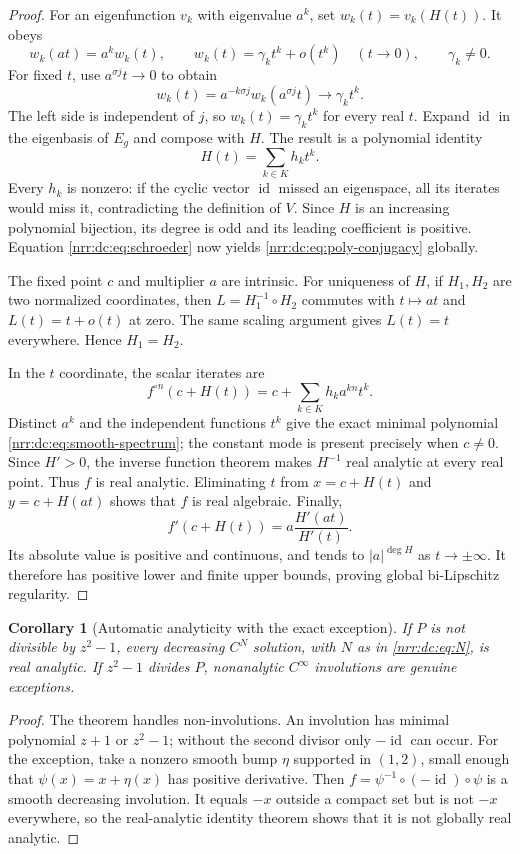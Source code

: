 \documentclass[11pt,letterpaper]{article}
\newtheorem{corollary}[theorem]{Corollary}
\theoremstyle{definition}
\theoremstyle{remark}
\newcommand{\id}{\operatorname{id}}
\begin{document}
\begin{proof}
For an eigenfunction $v_k$ with eigenvalue $a^k$, set
$w_k(t)=v_k(H(t))$. It obeys
\[
 w_k(at)=a^k w_k(t),\qquad
 w_k(t)=\gamma_k t^k+o(t^k)\quad(t\to0),\qquad\gamma_k\ne0.
\]
For fixed $t$, use $a^{\sigma j}t\to0$ to obtain
\[
 w_k(t)=a^{-k\sigma j}w_k(a^{\sigma j}t)
       \longrightarrow\gamma_k t^k.
\]
The left side is independent of $j$, so $w_k(t)=\gamma_k t^k$
for every real $t$. Expand $\id$ in the eigenbasis of $E_g$ and compose
with $H$. The result is a polynomial identity
\begin{equation}
 H(t)=\sum_{k\in K}h_kt^k.
 \label{nrr:dc:eq:H-polynomial}
\end{equation}
Every $h_k$ is nonzero: if the cyclic vector $\id$ missed an eigenspace,
all its iterates would miss it, contradicting the definition of $V$.
Since $H$ is an increasing polynomial bijection, its degree is odd
and its leading coefficient is positive. Equation \eqref{nrr:dc:eq:schroeder}
now yields \eqref{nrr:dc:eq:poly-conjugacy} globally.

The fixed point $c$ and multiplier $a$ are intrinsic. For uniqueness
of $H$, if $H_1,H_2$ are two normalized coordinates, then
$L=H_1^{-1}\circ H_2$ commutes with $t\mapsto at$ and
$L(t)=t+o(t)$ at zero. The same scaling argument gives $L(t)=t$
everywhere. Hence $H_1=H_2$.

In the $t$ coordinate, the scalar iterates are
\begin{equation}
 f^{\circ n}(c+H(t))=c+\sum_{k\in K}h_k a^{kn}t^k.
 \label{nrr:dc:eq:smooth-iterates}
\end{equation}
Distinct $a^k$ and the independent functions $t^k$ give the exact
minimal polynomial \eqref{nrr:dc:eq:smooth-spectrum}; the constant mode
is present precisely when $c\ne0$. Since $H'>0$, the inverse
function theorem makes $H^{-1}$ real analytic at every real point.
Thus $f$ is real analytic. Eliminating $t$ from
$x=c+H(t)$ and $y=c+H(at)$ shows that $f$ is real algebraic.
Finally,
\[
 f'(c+H(t))=a\frac{H'(at)}{H'(t)}.
\]
Its absolute value is positive and continuous, and tends to
$|a|^{\deg H}$ as $t\to\pm\infty$. It therefore has positive lower
and finite upper bounds, proving global bi-Lipschitz regularity.
\end{proof}

\begin{corollary}[Automatic analyticity with the exact exception]
\label{nrr:dc:cor:automatic}
If $P$ is not divisible by $z^2-1$, every decreasing $C^N$ solution,
with $N$ as in \eqref{nrr:dc:eq:N}, is real analytic. If $z^2-1$ divides
$P$, nonanalytic $C^\infty$ involutions are genuine exceptions.
\end{corollary}
\begin{proof}
The theorem handles non-involutions. An involution has minimal
polynomial $z+1$ or $z^2-1$; without the second divisor only $-\id$
can occur.
For the exception, take a nonzero smooth bump $\eta$ supported in
$(1,2)$, small enough that $\psi(x)=x+\eta(x)$ has positive derivative.
Then $f=\psi^{-1}\circ(-\id)\circ\psi$ is a smooth decreasing
involution. It equals $-x$ outside a compact set but is not $-x$
everywhere, so the real-analytic identity theorem shows that it is
not globally real analytic.
\end{proof}
\end{document}
